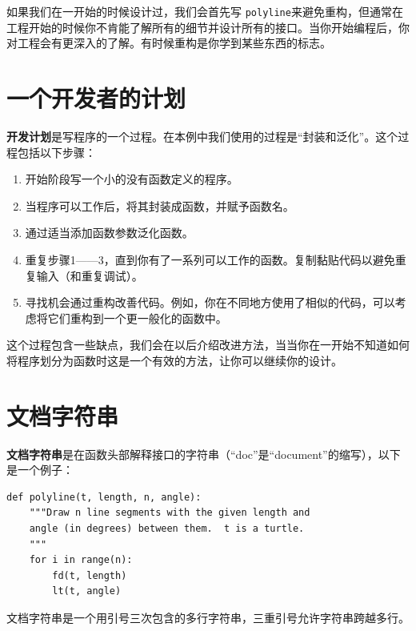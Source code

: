 如果我们在一开始的时候设计过，我们会首先写 {\tt polyline}来避免重构，但通常在工程开始的时候你不肯能了解所有的细节并设计所有的接口。当你开始编程后，你对工程会有更深入的了解。有时候重构是你学到某些东西的标志。


\section{一个开发者的计划}

{\bf 开发计划}是写程序的一个过程。在本例中我们使用的过程是“封装和泛化”。这个过程包括以下步骤：

\begin{enumerate}

\item 开始阶段写一个小的没有函数定义的程序。

\item 当程序可以工作后，将其封装成函数，并赋予函数名。

\item 通过适当添加函数参数泛化函数。

\item 重复步骤1——3，直到你有了一系列可以工作的函数。复制黏贴代码以避免重复输入（和重复调试）。

\item 寻找机会通过重构改善代码。例如，你在不同地方使用了相似的代码，可以考虑将它们重构到一个更一般化的函数中。

\end{enumerate}

这个过程包含一些缺点，我们会在以后介绍改进方法，当当你在一开始不知道如何将程序划分为函数时这是一个有效的方法，让你可以继续你的设计。


\section{文档字符串}
\label{文档字符串}

{\bf 文档字符串}是在函数头部解释接口的字符串（“doc”是“document”的缩写），以下是一个例子：

\beforeverb
\begin{verbatim}
def polyline(t, length, n, angle):
    """Draw n line segments with the given length and
    angle (in degrees) between them.  t is a turtle.
    """    
    for i in range(n):
        fd(t, length)
        lt(t, angle)
\end{verbatim}
\afterverb
%
文档字符串是一个用引号三次包含的多行字符串，三重引号允许字符串跨越多行。

